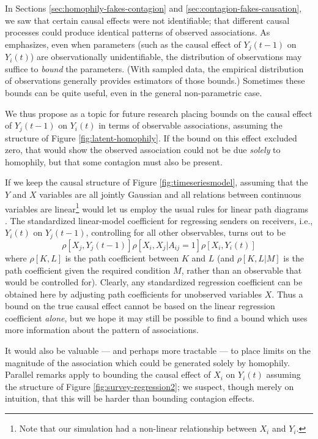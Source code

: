 \documentclass{article}
\begin{document}
\begin{multicols}{2}
In Sections \ref{sec:homophily-fakes-contagion} and
\ref{sec:contagion-fakes-causation}, we saw that certain causal effects were
not identifiable; that different causal processes could produce identical
patterns of observed associations.  As
\citet{Manski-identification-for-prediction} emphasizes, even when parameters
(such as the causal effect of $Y_j(t-1)$ on $Y_i(t)$) are observationally
unidentifiable, the distribution of observations may suffice to {\em bound} the
parameters.  (With sampled data, the empirical distribution of observations
generally provides estimators of those bounds.)  Sometimes these bounds can be
quite useful, even in the general non-parametric case.

We thus propose as a topic for future research placing bounds on the causal
effect of $Y_{j}(t-1)$ on $Y_i(t)$ in terms of observable associations,
assuming the structure of Figure \ref{fig:latent-homophily}.  If the bound on
this effect excluded zero, that would show the observed association could not
be due {\em solely} to homophily, but that some contagion must also be present.

If we keep the causal structure of Figure \ref{fig:timeseriesmodel}, assuming
that the $Y$ and $X$ variables are all jointly Gaussian and all relations
between continuous variables are linear\footnote{Note that our simulation had a
  non-linear relationship between $X_i$ and $Y_i$.} would let us employ the
usual rules for linear path diagrams \citep{Spirtes-Glymour-Scheines}.  The
standardized linear-model coefficient for regressing senders on receivers,
i.e., $Y_i(t)$ on $Y_j(t-1)$, controlling for all other observables, turns out
to be
\[
\rho[X_j, Y_j(t-1)] \rho[X_i, X_j|A_{ij}=1]\rho[X_i, Y_i(t)]
\]
where $\rho[K,L]$ is the path coefficient between $K$ and $L$ (and
$\rho[K,L|M]$ is the path coefficient given the required condition
$M$, rather than an observable that would be controlled for). Clearly, any
standardized regression coefficient can be obtained here by adjusting
path coefficients for unobserved variables $X$.  Thus a bound on the true causal
effect cannot be based on the linear regression coefficient {\em alone}, but we
hope it may still be possible to find a bound which uses more information about
the pattern of associations.

It would also be valuable --- and perhaps more tractable --- to place limits on
the magnitude of the association which could be generated solely by homophily.
Parallel remarks apply to bounding the causal effect of $X_i$ on $Y_i(t)$
assuming the structure of Figure \ref{fig:survey-regression2}; we suspect,
though merely on intuition, that this will be harder than bounding contagion
effects.


\end{multicols}
\end{document}
